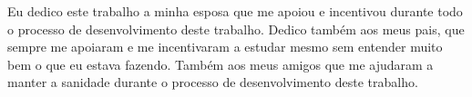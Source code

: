 
Eu dedico este trabalho a minha esposa que me apoiou e incentivou durante todo o processo de desenvolvimento deste trabalho.
Dedico também aos meus pais, que sempre me apoiaram e me incentivaram a estudar mesmo sem entender muito bem o que eu estava fazendo.
Também aos meus amigos que me ajudaram a manter a sanidade durante o processo de desenvolvimento deste trabalho.